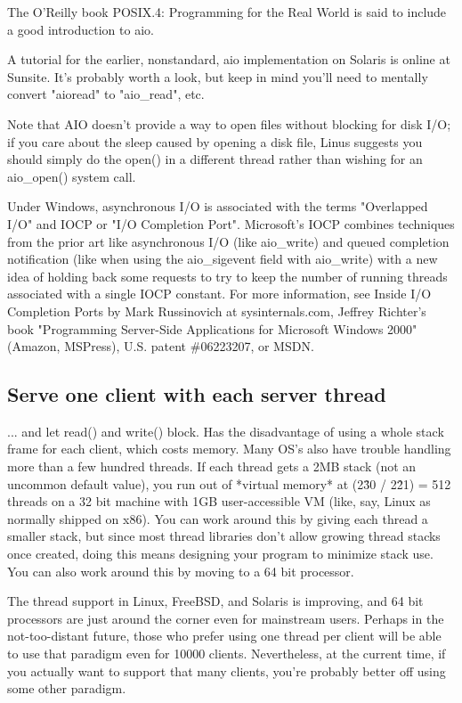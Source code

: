 \documentclass[12pt, twoside, a4paper, xetex]{report}
\begin{document}
The O'Reilly book POSIX.4: Programming for the Real World is said to include a good introduction to aio.

A tutorial for the earlier, nonstandard, aio implementation on Solaris is online at Sunsite. It's probably worth a look, but keep in mind you'll need to mentally convert "aioread" to "aio\_read", etc.

Note that AIO doesn't provide a way to open files without blocking for disk I/O; if you care about the sleep caused by opening a disk file, Linus suggests you should simply do the open() in a different thread rather than wishing for an aio\_open() system call.

Under Windows, asynchronous I/O is associated with the terms "Overlapped I/O" and IOCP or "I/O Completion Port". Microsoft's IOCP combines techniques from the prior art like asynchronous I/O (like aio\_write) and queued completion notification (like when using the aio\_sigevent field with aio\_write) with a new idea of holding back some requests to try to keep the number of running threads associated with a single IOCP constant. For more information, see Inside I/O Completion Ports by Mark Russinovich at sysinternals.com, Jeffrey Richter's book "Programming Server-Side Applications for Microsoft Windows 2000" (Amazon, MSPress), U.S. patent \#06223207, or MSDN.

\subsection*{Serve one client with each server thread}

... and let read() and write() block. Has the disadvantage of using a whole stack frame for each client, which costs memory. Many OS's also have trouble handling more than a few hundred threads. If each thread gets a 2MB stack (not an uncommon default value), you run out of *virtual memory* at (2\^30 / 2\^21) = 512 threads on a 32 bit machine with 1GB user-accessible VM (like, say, Linux as normally shipped on x86). You can work around this by giving each thread a smaller stack, but since most thread libraries don't allow growing thread stacks once created, doing this means designing your program to minimize stack use. You can also work around this by moving to a 64 bit processor.

The thread support in Linux, FreeBSD, and Solaris is improving, and 64 bit processors are just around the corner even for mainstream users. Perhaps in the not-too-distant future, those who prefer using one thread per client will be able to use that paradigm even for 10000 clients. Nevertheless, at the current time, if you actually want to support that many clients, you're probably better off using some other paradigm.
\end{document}
